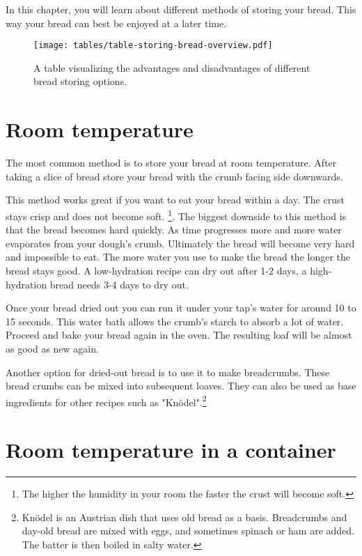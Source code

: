 In this chapter, you will learn about different
methods of storing your bread. This way
your bread can best be enjoyed at a later
time.

\begin{figure}[!htb]
  \texttt{[image: tables/table-storing-bread-overview.pdf]}
  \caption{A table visualizing the advantages and disadvantages
  of different bread storing options.}
  \label{table:bread-storage}
\end{figure}

\section{Room temperature}

The most common method is to store your bread
at room temperature. After taking a slice of bread
store your bread with the crumb facing side
downwards.

This method works great if you want to eat
your bread within a day. The crust stays
crisp and does not become soft. \footnote{
  The higher the humidity in your room the faster
  the crust will become soft.
}. The biggest downside to this method is that
the bread becomes hard quickly. As time progresses
more and more water evaporates from your dough's
crumb. Ultimately the bread will become very hard
and impossible to eat. The more water you use
to make the bread the longer the bread stays good.
A low-hydration recipe can dry out after 1-2 days,
a high-hydration bread needs 3-4 days to dry out.

Once your bread dried out you can run it under
your tap's water for around 10 to 15 seconds. 
This water bath allows the
crumb's starch to absorb a lot of water. Proceed and
bake your bread again in the oven. The resulting loaf
will be almost as good as new again.

Another option for dried-out bread is to use it
to make breadcrumbs. These bread crumbs can be mixed
into subsequent loaves. They can also be used as
base ingredients for other recipes such as "Knödel".\footnote{
  Knödel is an Austrian dish that uses old bread as a basis.
  Breadcrumbs and day-old bread are mixed with eggs, and sometimes
  spinach or ham are added. The batter is then boiled in salty water.
}

\section{Room temperature in a container}

